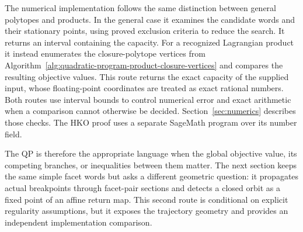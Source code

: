 The numerical implementation follows the same distinction between general
polytopes and products. In the general case it examines the candidate words
and their stationary points, using proved exclusion criteria to reduce the
search. It returns an interval containing the capacity. For a recognized
Lagrangian product it instead enumerates the closure-polytope vertices from
Algorithm~\ref{alg:quadratic-program-product-closure-vertices} and compares
the resulting objective values. This route returns the exact capacity of
the supplied input, whose floating-point coordinates are treated as exact
rational numbers. Both routes use interval bounds to control numerical error
and exact arithmetic when a comparison cannot otherwise be decided.
Section~\ref{sec:numerics} describes those checks. The HKO proof uses a
separate SageMath program over its number field.

The QP is therefore the appropriate language when the global objective value,
its competing branches, or inequalities between them matter.  The next
section keeps the same simple facet words but asks a different geometric
question: it propagates actual breakpoints through facet-pair sections and
detects a closed orbit as a fixed point of an affine return map.  This second
route is conditional on explicit regularity assumptions, but it exposes the
trajectory geometry and provides an independent implementation comparison.
